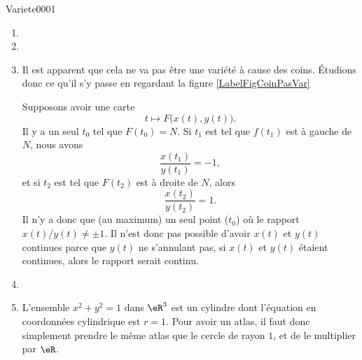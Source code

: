 \begin{corrige}{Variete0001}
\begin{enumerate}
		\item
		\item
		\item
			Il est apparent que cela ne va pas être une variété à cause des coins. Étudions donc ce qu'il s'y passe en regardant la figure \ref{LabelFigCoinPasVar}
			\newcommand{\CaptionFigCoinPasVar}{Ceci n'est pas une variété. Même pas le dessin d'une variété.}
			
			Supposons avoir une carte
			\begin{equation}
				t\mapsto F\big( x(t),y(t) \big).
			\end{equation}
			Il y a un seul $t_0$ tel que $F(t_0)=N$. Si $t_1$ est tel que $f(t_1)$ est à gauche de $N$, nous avons
			\begin{equation}
				\frac{ x(t_1) }{ y(t_1) }=-1,
			\end{equation}
			et si $t_2$ est tel que $F(t_2)$ est à droite de $N$, alors
			\begin{equation}
				\frac{ x(t_2) }{ y(t_2) }=1.
			\end{equation}
			Il n'y a donc que (au maximum) un seul point ($t_0$) où le rapport $x(t)/y(t)\neq\pm 1$. Il n'est donc pas possible d'avoir $x(t)$ et $y(t)$ continues parce que $y(t)$ ne s'annulant pas, si $x(t)$ et $y(t)$ étaient continues, alors le rapport serait continu.

		\item
		\item
			L'ensemble $x^2+y^2=1$ dans $\eR^3$ est un cylindre dont l'équation en coordonnées cylindrique est $r=1$. Pour avoir un atlas, il faut donc simplement prendre le même atlas que le cercle de rayon $1$, et de le \og multiplier\fg{} par $\eR$.


\end{enumerate}
\end{corrige}
